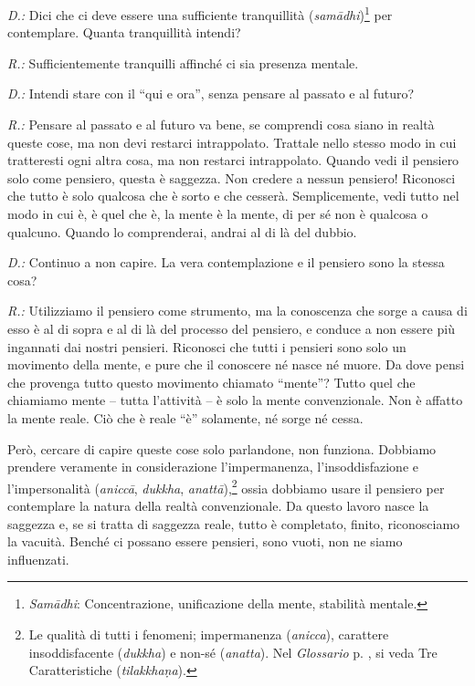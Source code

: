 \emph{D.:} Dici che ci deve essere una sufficiente tranquillità
(\emph{samādhi})\footnote{\emph{Samādhi}:
  Concentrazione, unificazione della mente, stabilità mentale.} per
contemplare. Quanta tranquillità intendi?

\emph{R.:} Sufficientemente tranquilli affinché ci sia presenza mentale.

\emph{D.:} Intendi stare con il ``qui e ora'', senza pensare al passato e al
futuro?

\emph{R.:} Pensare al passato e al futuro va bene, se comprendi cosa siano in
realtà queste cose, ma non devi restarci intrappolato. Trattale nello
stesso modo in cui tratteresti ogni altra cosa, ma non restarci
intrappolato. Quando vedi il pensiero solo come pensiero, questa è
saggezza. Non credere a nessun pensiero! Riconosci che tutto è solo
qualcosa che è sorto e che cesserà. Semplicemente, vedi tutto nel modo
in cui è, è quel che è, la mente è la mente, di per sé non è qualcosa o
qualcuno. Quando lo comprenderai, andrai al di là del dubbio.

\emph{D.:} Continuo a non capire. La vera contemplazione e il pensiero sono la
stessa cosa?

\emph{R.:} Utilizziamo il pensiero come strumento, ma la conoscenza che sorge a
causa di esso è al di sopra e al di là del processo del pensiero, e
conduce a non essere più ingannati dai nostri pensieri. Riconosci che
tutti i pensieri sono solo un movimento della mente, e pure che il
conoscere né nasce né muore. Da dove pensi che provenga tutto questo
movimento chiamato ``mente''? Tutto quel che chiamiamo mente -- tutta
l'attività -- è solo la mente convenzionale. Non è affatto la mente
reale. Ciò che è reale ``è'' solamente, né sorge né cessa.

Però, cercare di capire queste cose solo parlandone, non funziona.
Dobbiamo prendere veramente in considerazione l'impermanenza,
l'insoddisfazione e l'impersonalità (\emph{aniccā}, \emph{dukkha},
\emph{anattā}),\footnote{Le qualità di tutti i fenomeni; impermanenza
  (\emph{anicca}), carattere insoddisfacente (\emph{dukkha}) e non-sé
  (\emph{anatta}). Nel \emph{Glossario} p. \pageref{glossary-tilakkhana}, si veda Tre Caratteristiche
  (\emph{tilakkhaṇa}).} ossia dobbiamo usare il pensiero per contemplare
la natura della realtà convenzionale. Da questo lavoro nasce la saggezza
e, se si tratta di saggezza reale, tutto è completato, finito,
riconosciamo la vacuità. Benché ci possano essere pensieri, sono vuoti,
non ne siamo influenzati.

